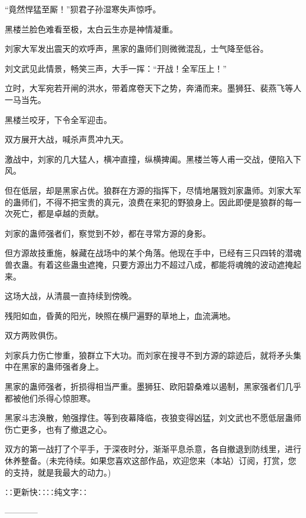 \begin{this_body}
“竟然悍猛至厮！”狈君子孙湿寒失声惊呼。

黑楼兰脸色难看至极，太白云生亦是神情凝重。

刘家大军发出震天的欢呼声，黑家的蛊师们则微微混乱，士气降至低谷。

刘文武见此情景，畅笑三声，大手一挥：“开战！全军压上！”

立时，大军宛若开闸的洪水，带着席卷天下之势，奔涌而来。墨狮狂、裴燕飞等人一马当先。

黑楼兰咬牙，下令全军迎击。

双方展开大战，喊杀声贯冲九天。

激战中，刘家的几大猛人，横冲直撞，纵横捭阖。黑楼兰等人甫一交战，便陷入下风。

但在低层，却是黑家占优。狼群在方源的指挥下，尽情地屠戮刘家蛊师。刘家大军的蛊师们，不得不把宝贵的真元，浪费在来犯的野狼身上。因此即便是狼群的每一次死亡，都是卓越的贡献。

刘家的蛊师强者们，察觉到不妙，都在寻常方源的身影。

但方源故技重施，躲藏在战场中的某个角落。他现在手中，已经有三只四转的潜魂兽衣蛊。有着这些蛊虫遮掩，只要方源出力不超过八成，都能将魂魄的波动遮掩起来。

这场大战，从清晨一直持续到傍晚。

残阳如血，昏黄的阳光，映照在横尸遍野的草地上，血流满地。

双方两败俱伤。

刘家兵力伤亡惨重，狼群立下大功。而刘家在搜寻不到方源的踪迹后，就将矛头集中在黑家的蛊师强者身上。

黑家的蛊师强者，折损得相当严重。墨狮狂、欧阳碧桑难以遏制，黑家强者们几乎都被他们杀得心惊胆寒。

黑家斗志涣散，勉强撑住。等到夜幕降临，夜狼变得凶猛，刘文武也不愿低层蛊师伤亡更多，也有了撤退之心。

双方的第一战打了个平手，于深夜时分，渐渐平息杀意，各自撤退到防线里，进行休养整备。(未完待续。如果您喜欢这部作品，欢迎您来（本站）订阅，打赏，您的支持，就是我最大的动力。)

∷更新快∷∷纯文字∷

------------

\end{this_body}

